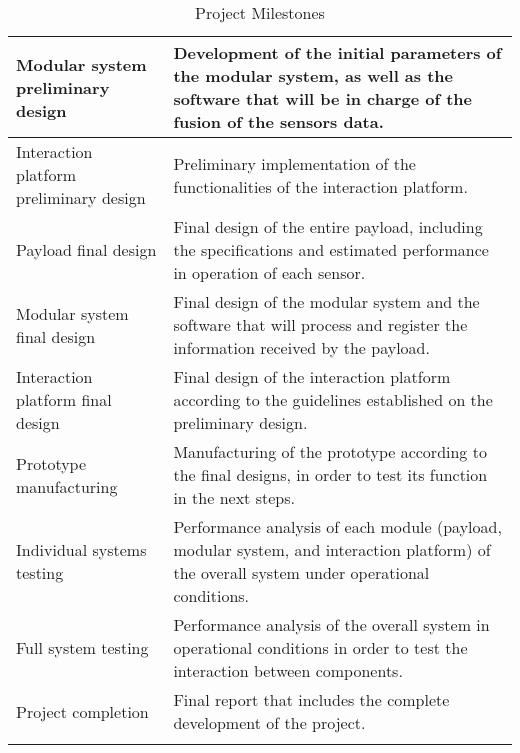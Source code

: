 \begin{longtable}[H]{>{\raggedright\arraybackslash}p{4cm} p{10cm}}
	\midrule
	
	Modular system preliminary design & Development of the initial parameters of the modular system, as well as the software that will be in charge of the fusion of the sensors data.\vspace{0.2cm} \\
	
	\midrule
	
	Interaction platform preliminary design & Preliminary implementation of the functionalities of the interaction platform.\vspace{0.2cm} \\
	
	\midrule
	
	Payload final design & Final design of the entire payload, including the specifications and estimated performance in operation of each sensor.\vspace{0.2cm} \\
	
	\midrule
	
	Modular system final design & Final design of the modular system and the software that will process and register the information received by the payload.\vspace{0.2cm} \\
	
	\midrule
	
	Interaction platform final design & Final design of the interaction platform according to the guidelines established on the preliminary design.\vspace{0.2cm} \\
	
	\midrule
	
	Prototype manufacturing & Manufacturing of the prototype according to the final designs, in order to test its function in the next steps.\vspace{0.2cm} \\
	
	\midrule
	
	Individual systems testing & Performance analysis of each module (payload, modular system, and interaction platform) of the overall system under operational conditions.\vspace{0.2cm} \\
	
	\midrule
	
	Full system testing & Performance analysis of the overall system in operational conditions in order to test the interaction between components.\vspace{0.2cm} \\
	
	\midrule
	
	Project completion & Final report that includes the complete development of the project.\vspace{0.2cm} \\
	
	\bottomrule[2pt]
	
	\caption{Project Milestones}
	\label{tabla_milestones}
\end{longtable}